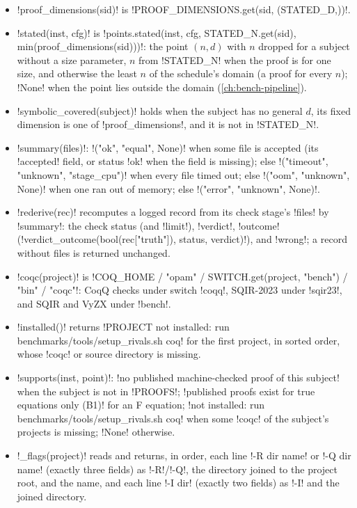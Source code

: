 {\begin{itemize}
\item \py!proof_dimensions(sid)! is \py!PROOF_DIMENSIONS.get(sid, (STATED_D,))!.
\item \py!stated(inst, cfg)! is \py!points.stated(inst, cfg, STATED_N.get(sid), min(proof_dimensions(sid)))!: the point $(n,d)$ with $n$ dropped for a subject without a size parameter, $n$ from \py!STATED_N! when the proof is for one size, and otherwise the least $n$ of the schedule's domain (a proof for every $n$); \py!None! when the point lies outside the domain (\cref{ch:bench-pipeline}).
\item \py!symbolic_covered(subject)! holds when the subject has no general $d$, its fixed dimension is one of \py!proof_dimensions!, and it is not in \py!STATED_N!.
\item \py!summary(files)!: \py!("ok", "equal", None)! when some file is accepted (its \code!accepted! field, or status \code!ok! when the field is missing); else \py!("timeout", "unknown", "stage_cpu")! when every file timed out; else \py!("oom", "unknown", None)! when one ran out of memory; else \py!("error", "unknown", None)!.
\item \py!rederive(rec)! recomputes a logged record from its check stage's \code!files! by \py!summary!: the check status (and \code!limit!), \code!verdict!, \code!outcome! (\py!verdict_outcome(bool(rec["truth"]), status, verdict)!), and \code!wrong!; a record without files is returned unchanged.
\item \py!coqc(project)! is \py!COQ_HOME / "opam" / SWITCH.get(project, "bench") / "bin" / "coqc"!: CoqQ checks under switch \code!coqq!, SQIR-2023 under \code!sqir23!, and SQIR and VyZX under \code!bench!.
\item \py!installed()! returns \code!PROJECT not installed: run benchmarks/tools/setup_rivals.sh coq! for the first project, in sorted order, whose \code!coqc! or source directory is missing.
\item \py!supports(inst, point)!: \code!no published machine-checked proof of this subject! when the subject is not in \py!PROOFS!; \code!published proofs exist for true equations only (B1)! for an F equation; \code!not installed: run benchmarks/tools/setup_rivals.sh coq! when some \code!coqc! of the subject's projects is missing; \py!None! otherwise.
\item \py!_flags(project)! reads  and returns, in order, each line \code!-R dir name! or \code!-Q dir name! (exactly three fields) as \code!-R!/\code!-Q!, the directory joined to the project root, and the name, and each line \code!-I dir! (exactly two fields) as \code!-I! and the joined directory.
\end{itemize}

}
